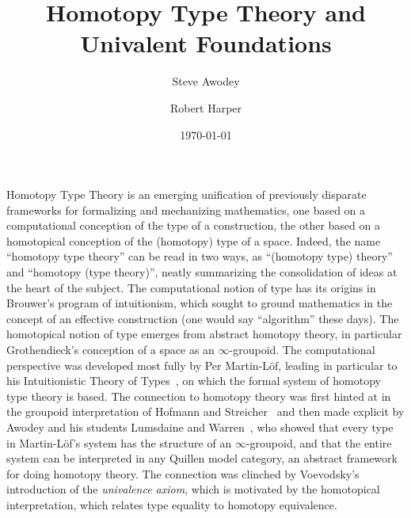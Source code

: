 \documentclass[11pt]{article}
\theoremstyle{remark}
\theoremstyle{definition}
\begin{document}

\title{Homotopy Type Theory and Univalent Foundations}
\author{Steve Awodey \and Robert Harper}
\date{\today}

\maketitle

Homotopy Type Theory is an emerging unification of previously disparate frameworks for formalizing and mechanizing
mathematics, one based on a computational conception of the type of a construction, the other based on a homotopical
conception of the (homotopy) type of a space.  Indeed, the name ``homotopy type theory'' can be read in two ways, as
``(homotopy type) theory'' and ``homotopy (type theory)'', neatly summarizing the consolidation of ideas at the heart of
the subject.  The computational notion of type has its origins in Brouwer's program of intuitionism, which sought to
ground mathematics in the concept of an effective construction (one would say ``algorithm'' these days).  The
homotopical notion of type emerges from abstract homotopy theory, in particular Grothendieck's conception of a space as
an $\infty$-groupoid.  The computational perspective was developed most fully by Per Martin-L\"{o}f, leading in
particular to his Intuitionistic Theory of Types~\cite{mltt}, on which the formal system of homotopy type theory is
based.  The connection to homotopy theory was first hinted at in the groupoid interpretation of Hofmann and
Streicher~\cite{HS} and then made explicit by Awodey and his students Lumsdaine and Warren~\cite{AW,AL}, who showed that
every type in Martin-L\"{o}f's system has the structure of an $\infty$-groupoid, and that the entire system can be
interpreted in any Quillen model category, an abstract framework for doing homotopy theory.  The connection was clinched
by Voevodsky's introduction of the \emph{univalence axiom}, which is motivated by the homotopical interpretation, which
relates type equality to homotopy equivalence.
\end{document}
